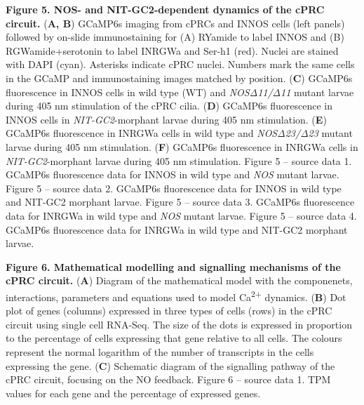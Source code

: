 \documentclass[
  11pt,
  letterpaper,
  DIV=11,
  numbers=noendperiod]{scrartcl}
\begin{document}
\textbf{Figure 5. NOS- and NIT-GC2-dependent dynamics of the cPRC
circuit.} (\textbf{A, B}) GCaMP6s imaging from cPRCs and INNOS cells
(left panels) followed by on-slide immunostaining for (A) RYamide to
label INNOS and (B) RGWamide+serotonin to label INRGWa and Ser-h1 (red).
Nuclei are stained with DAPI (cyan). Asterisks indicate cPRC nuclei.
Numbers mark the same cells in the GCaMP and immunostaining images
matched by position. (\textbf{C}) GCaMP6s fluorescence in INNOS cells in
wild type (WT) and \emph{NOSΔ11/Δ11} mutant larvae during 405 nm
stimulation of the cPRC cilia. (\textbf{D}) GCaMP6s fluorescence in
INNOS cells in \emph{NIT-GC2}-morphant larvae during 405 nm stimulation.
(\textbf{E}) GCaMP6s fluorescence in INRGWa cells in wild type and
\emph{NOSΔ23/Δ23} mutant larvae during 405 nm stimulation. (\textbf{F})
GCaMP6s fluorescence in INRGWa cells in \emph{NIT-GC2}-morphant larvae
during 405 nm stimulation. Figure 5 -- source data 1. GCaMP6s
fluorescence data for INNOS in wild type and \emph{NOS} mutant larvae.
Figure 5 -- source data 2. GCaMP6s fluorescence data for INNOS in wild
type and NIT-GC2 morphant larvae. Figure 5 -- source data 3. GCaMP6s
fluorescence data for INRGWa in wild type and \emph{NOS} mutant larvae.
Figure 5 -- source data 4. GCaMP6s fluorescence data for INRGWa in wild
type and NIT-GC2 morphant larvae.

\textbf{Figure 6. Mathematical modelling and signalling mechanisms of
the cPRC circuit.} (\textbf{A}) Diagram of the mathematical model with
the componenets, interactions, parameters and equations used to model
Ca\textsuperscript{2+} dynamics. (\textbf{B}) Dot plot of genes
(columns) expressed in three types of cells (rows) in the cPRC circuit
using single cell RNA-Seq. The size of the dots is expressed in
proportion to the percentage of cells expressing that gene relative to
all cells. The colours represent the normal logarithm of the number of
transcripts in the cells expressing the gene. (\textbf{C}) Schematic
diagram of the signalling pathway of the cPRC circuit, focusing on the
NO feedback. Figure 6 -- source data 1. TPM values for each gene and the
percentage of expressed genes.
\end{document}
